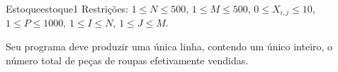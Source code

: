 \documentclass[12pt,a4paper,oneside]{article}
\begin{document}
\begin{problem}{Estoque}{estoque}{1}
Restrições: $1 \leq N \leq 500$, $1 \leq M \leq 500$, $0 \leq X_{i,j} \leq 10$, $1 \leq P \leq 1000$, $1 \leq I \leq N$, $1 \leq J \leq M$.

\OutputFile

Seu programa deve produzir uma única linha, contendo um único inteiro, o número total de peças de roupas efetivamente vendidas.



\Example

\begin{example}
%
\end{example}

\begin{example}
%
\end{example}







\end{problem}
\end{document}
